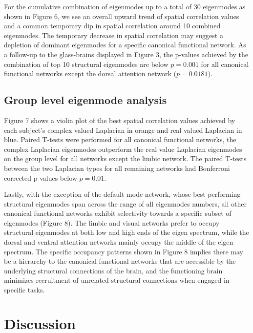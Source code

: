 \documentclass{article}
\begin{document}
For the cumulative combination of eigenmodes up to a total of 30 eigenmodes as shown in Figure 6, we see an overall upward trend of spatial correlation values and a common temporary dip in spatial correlation around 10 combined eigenmodes. The temporary decrease in spatial correlation may suggest a depletion of dominant eigenmodes for a specific canonical functional network. As a follow-up to the glass-brains displayed in Figure 3, the p-values achieved by the combination of top 10 structural eigenmodes are below $p = 0.001$ for all canonical functional networks except the dorsal attention network ($p = 0.0181$).

\subsection{Group level eigenmode analysis}
Figure 7 shows a violin plot of the best spatial correlation values achieved by each subject's complex valued Laplacian in orange and real valued Laplacian in blue. Paired T-tests were performed for all canonical functional networks, the complex Laplacian eigenmodes outperform the real value Laplacian eigenmodes on the group level for all networks except the limbic network. The paired T-tests between the two Laplacian types for all remaining networks had Bonferroni corrected p-values below $p = 0.01$. 

Lastly, with the exception of the default mode network, whose best performing structural eigenmodes span across the range of all eigenmodes numbers, all other canonical functional networks exhibit selectivity towards a specific subset of eigenmodes (Figure 8). The limbic and visual networks prefer to occupy structural eigenmodes at both low and high ends of the eigen spectrum, while the dorsal and ventral attention networks mainly occupy the middle of the eigen spectrum. The specific occupancy patterns shown in Figure 8 implies there may be a hierarchy to the canonical functional networks that are accessible by the underlying structural connections of the brain, and the functioning brain minimizes recruitment of unrelated structural connections when engaged in specific tasks. 

\section{Discussion}


  
  
\end{document}

